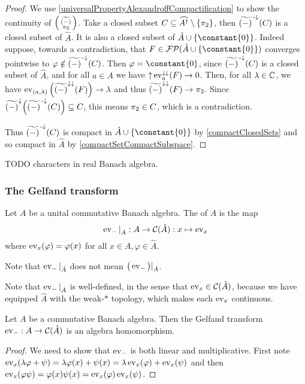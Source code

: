 \begin{proof}
We use \ref{universalPropertyAlexandroffCompactification} to show the continuity of $\left(\begin{smallmatrix}
\widetilde{(-)} \\ \pi_2
\end{smallmatrix}\right)$. Take a closed subset $C\subseteq \widehat{A^\dagger}\setminus \{\pi_2\}$, then $\widetilde{(-)}^{{\text{\hspace{0.15em}-}\downarrow}}(C)$ is a closed subset of $\hat{A}$. It is also a closed subset of $\hat{A}\cup\{\constant{0}\}$. Indeed suppose, towards a contradiction, that $F\in \powerfilters(\hat{A}\cup\{\constant{0}\})$ converges pointwise to $\varphi \notin \widetilde{(-)}^{{\text{\hspace{0.15em}-}\downarrow}}(C)$. Then $\varphi = \constant{0}$, since $\widetilde{(-)}^{{\text{\hspace{0.15em}-}\downarrow}}(C)$ is a closed subset of $\hat{A}$, and for all $a\in A$ we have $\operatorname{\uparrow}\operatorname{ev}_a^{\downarrow\downarrow}(F) \to 0$. Then, for all $\lambda \in \mathbb{C}$, we have $\operatorname{ev}_{(a,\lambda)}\Big(\widetilde{(-)}^{\downarrow\downarrow}(F)\Big) \to \lambda$ and thus $\widetilde{(-)}^{\downarrow\downarrow}(F) \to \pi_2$. Since $\widetilde{(-)}^\downarrow\Big(\widetilde{(-)}^{\text{\hspace{0.15em}-}\downarrow}(C)\Big)\subseteq C$, this means $\pi_2\in C$, which is a contradiction.

Thus $\widetilde{(-)}^{{\text{\hspace{0.15em}-}\downarrow}}(C)$ is compact in $\hat{A}\cup \{\constant{0}\}$ by \ref{compactClosedSets} and so compact in $\hat{A}$ by \ref{compactSetCompactSubspace}.
\end{proof}

TODO characters in real Banach algebra.


\subsubsection{The Gelfand transform}
\begin{definition}
Let $A$ be a unital commutative Banach algebra. The  of $A$ is the map
\[ \operatorname{ev}_{-}|_{\hat{A}} : A\to \operatorname{\mathcal{C}}(\hat{A}): x\mapsto \operatorname{ev}_x \]
where $\operatorname{ev}_x(\varphi) = \varphi(x)$ for all $x\in A, \varphi\in\hat{A}$.
\end{definition}
Note that $\operatorname{ev}_{-}|_{\hat{A}}$ does not mean $\big(\operatorname{ev}_{-}\big)|_{\hat{A}}$.


Note that $\operatorname{ev}_{-}|_{\hat{A}}$ is well-defined, in the sense that $\operatorname{ev}_{x} \in \operatorname{\mathcal{C}}(\hat{A})$, because we have equipped $\hat{A}$ with the weak-$*$ topology, which makes each $\operatorname{ev}_{x}$ continuous.

\begin{lemma} \label{GelfandTransformHomomorphism}
Let $A$ be a commutative Banach algebra. Then the Gelfand transform $\operatorname{ev}_{-} : A\to \operatorname{\mathcal{C}}(\hat{A})$ is an algebra homomorphism.
\end{lemma}
\begin{proof}
We need to show that $\operatorname{ev}_{-}$ is both linear and multiplicative. First note $\operatorname{ev}_{x}(\lambda \varphi + \psi) = \lambda \varphi(x) + \psi(x) = \lambda\operatorname{ev}_{x}(\varphi) + \operatorname{ev}_{x}(\psi)$ and then $\operatorname{ev}_{x}(\varphi\psi) = \varphi(x)\psi(x) = \operatorname{ev}_{x}(\varphi)\operatorname{ev}_{x}(\psi)$.
\end{proof}

